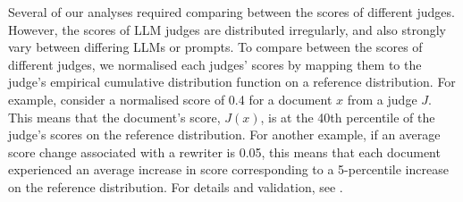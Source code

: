 

Several of our analyses required comparing between the scores of different judges. However, the scores of LLM judges are distributed irregularly, and also strongly vary between differing LLMs or prompts. To compare between the scores of different judges, we normalised each judges' scores by mapping them to the judge's empirical cumulative distribution function on a reference distribution. For example, consider a normalised score of 0.4 for a document $x$ from a judge $J$. This means that the document's score, $J(x)$, is at the 40th percentile of the judge's scores on the reference distribution. For another example, if an average score change associated with a rewriter is 0.05, this means that each document experienced an average increase in score corresponding to a 5-percentile increase on the reference distribution. For details and validation, see .


